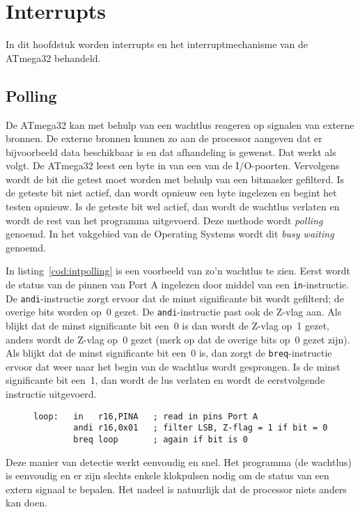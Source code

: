 \chapter{Interrupts}
In dit hoofdstuk worden interrupts en het interruptmechanisme van de ATmega32
behandeld.

\section{Polling}
De ATmega32 kan met behulp van een wachtlus reageren op signalen van
externe bronnen. De externe bronnen kunnen zo aan de processor aangeven
dat er bijvoorbeeld data beschikbaar is en dat afhandeling is gewenst.
Dat werkt als volgt. De ATmega32 leest een byte in van een van de
I/O-poorten. Vervolgens wordt de bit die getest moet worden met behulp
van een bitmasker gefilterd. Is de geteste bit niet actief, dan wordt
opnieuw een byte ingelezen en begint het testen opnieuw. Is de geteste
bit wel actief, dan wordt de wachtlus verlaten en wordt de rest van het
programma uitgevoerd. 
Deze methode wordt \textsl{polling} genoemd. In het vakgebied van de
Operating Systems wordt dit \textsl{busy waiting} genoemd.

In listing~\ref{cod:intpolling} is een voorbeeld van zo'n wachtlus te zien.
Eerst wordt de status van de pinnen van Port A ingelezen door middel van
een \lstinline|in|-instructie. De \lstinline|andi|-instructie zorgt ervoor
dat de minst significante bit wordt gefilterd; de overige bits worden op~0
gezet. De \lstinline|andi|-instructie past ook de Z-vlag aan. Als blijkt
dat de minst significante bit een~0 is dan wordt de Z-vlag op~1 gezet,
anders wordt de Z-vlag op~0 gezet (merk op dat de overige bits op~0 gezet
zijn). Als blijkt dat de minst significante bit een~0 is, dan zorgt de
\lstinline|breq|-instructie ervoor dat weer naar het begin van de wachtlus
wordt gesprongen. Is de minst significante bit een~1, dan wordt de lus
verlaten en wordt de eerstvolgende instructie uitgevoerd. 

\begin{figure}[!ht]
\begin{lstlisting}[language=AVRassembler,caption=Polling.,label=cod:intpolling]
loop:	in   r16,PINA   ; read in pins Port A
		andi r16,0x01   ; filter LSB, Z-flag = 1 if bit = 0
		breq loop       ; again if bit is 0
\end{lstlisting}
\end{figure}

Deze manier van detectie werkt eenvoudig en snel. Het programma (de wachtlus)
is eenvoudig en er zijn slechts enkele klokpulsen nodig om de status van een
extern signaal te bepalen. Het nadeel is natuurlijk dat de processor niets
anders kan doen.


